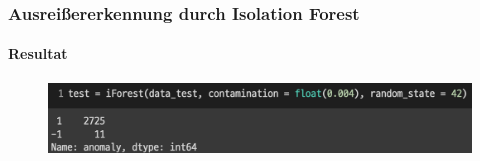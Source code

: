 \documentclass{beamer}
\begin{document}
    \begin{frame}
        \frametitle{Ausreißererkennung durch Isolation Forest}
        \framesubtitle{Resultat}
        
        \begin{figure}[ht]
            \centering
            \includegraphics[scale=0.5]{Resultat4.png}
            \hfil
        
            \hfill 	
            \hfill
         
        \end{figure}
    \end{frame}
    
\end{document}
